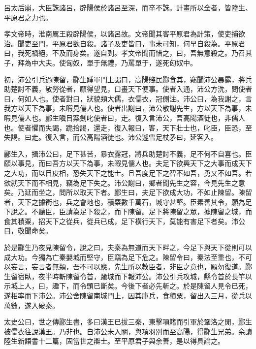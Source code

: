 呂太后崩，大臣誅諸呂，辟陽侯於諸呂至深，而卒不誅。計畫所以全者，皆陸生、平原君之力也。

孝文帝時，淮南厲王殺辟陽侯，以諸呂故。文帝聞其客平原君為計策，使吏捕欲治。聞吏至門，平原君欲自殺。諸子及吏皆曰，事未可知，何早自殺為。平原君曰，我死禍絕，不及而身矣。遂自剄。孝文帝聞而惜之，曰，吾無意殺之。乃召其子，拜為中大夫。使匈奴，單于無禮，乃罵單于，遂死匈奴中。

初，沛公引兵過陳留，酈生踵軍門上謁曰，高陽賤民酈食其，竊聞沛公暴露，將兵助楚討不義，敬勞從者，願得望見，口畫天下便事。使者入通，沛公方洗，問使者曰，何如人也。使者對曰，狀貌類大儒，衣儒衣，冠側注。沛公曰，為我謝之，言我方以天下為事，未暇見儒人也。使者出謝曰，沛公敬謝先生，方以天下為事，未暇見儒人也。酈生瞋目案劍叱使者曰，走。復入言沛公，吾高陽酒徒也，非儒人也。使者懼而失謁，跪拾謁，還走，復入報曰，客，天下壯士也，叱臣，臣恐，至失謁。曰走。復入言，而公高陽酒徒也。沛公遽雪足杖矛曰，延客入。

酈生入，揖沛公曰，足下甚苦，暴衣露冠，將兵助楚討不義，足不何不自喜也。臣願以事見，而曰吾方以天下為事，未暇見儒人也。夫足下欲興天下之大事而成天下之大功，而以目皮相，恐失天下之能士。且吾度足下之智不如吾，勇又不如吾。若欲就天下而不相見，竊為足下失之。沛公謝曰，鄉者聞先生之容，今見先生之意矣。乃延而坐之，問所以取天下者。酈生曰，夫足下欲成大功，不如止陳留。陳留者，天下之據衝也，兵之會地也，積粟數千萬石，城守甚堅。臣素善其令，願為足下說之。不聽臣，臣請為足下殺之，而下陳留。足下將陳留之眾，據陳留之城，而食其積粟，招天下之從兵，從兵已成，足下橫行天下，莫能有害足下者矣。沛公曰，敬聞命矣。

於是酈生乃夜見陳留令，說之曰，夫秦為無道而天下畔之，今足下與天下從則可以成大功。今獨為亡秦嬰城而堅守，臣竊為足下危之。陳留令曰，秦法至重也，不可以妄言，妄言者無類，吾不可以應。先生所以教臣者，非臣之意也，願勿復道。酈生留宿臥，夜半時斬陳留令首，踰城而下報沛公。沛公引兵攻城，縣令首於長竿以示城上人，曰，趣下，而令頭已斷矣。今後下者必先斬之。於是陳留人見令已死，遂相率而下沛公。沛公舍陳留南城門上，因其庫兵，食積粟，留出入三月，從兵以萬數，遂入破秦。

太史公曰，世之傳酈生書，多曰漢王已拔三秦，東擊項籍而引軍於鞏洛之閒，酈生被儒衣往說漢王。乃非也。自沛公未入關，與項羽別而至高陽，得酈生兄弟。余讀陸生新語書十二篇，固當世之辯士。至平原君子與余善，是以得具論之。